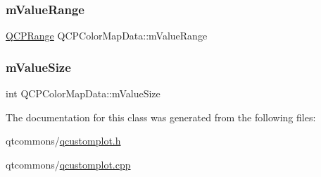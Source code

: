 \mbox{\label{class_q_c_p_color_map_data_a225bb96f10c1a27b51ae59249477dbef}} 
\subsubsection{\texorpdfstring{mValueRange}{mValueRange}}
{\footnotesize\ttfamily \mbox{\hyperlink{class_q_c_p_range}{Q\+C\+P\+Range}} Q\+C\+P\+Color\+Map\+Data\+::m\+Value\+Range\hspace{0.3cm}{\ttfamily [protected]}}

\mbox{\label{class_q_c_p_color_map_data_ae8ee9093632a59f55eb4fc06579ed256}} 
\subsubsection{\texorpdfstring{mValueSize}{mValueSize}}
{\footnotesize\ttfamily int Q\+C\+P\+Color\+Map\+Data\+::m\+Value\+Size\hspace{0.3cm}{\ttfamily [protected]}}



The documentation for this class was generated from the following files\+:\begin{DoxyCompactItemize}
\item 
qtcommons/\mbox{\hyperlink{qcustomplot_8h}{qcustomplot.\+h}}\item 
qtcommons/\mbox{\hyperlink{qcustomplot_8cpp}{qcustomplot.\+cpp}}\end{DoxyCompactItemize}
